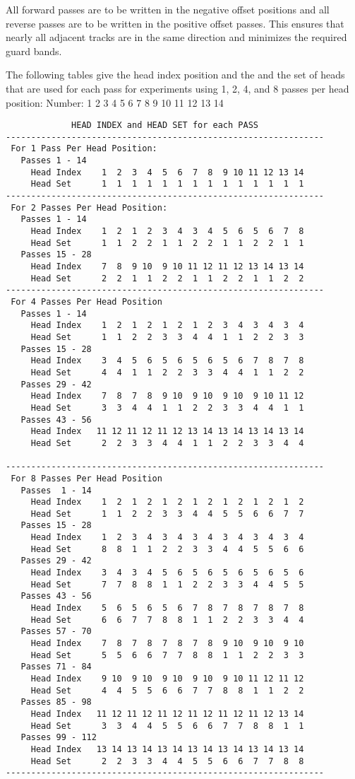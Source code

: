 \documentclass{report}
\begin{document}
All forward passes are to be written in the negative offset positions
and all reverse passes are to be written in the positive offset
passes.  This ensures that nearly all adjacent tracks are in the same
direction and minimizes the required guard bands.

The following tables give the head index position and the and the set
of heads that are used for each pass for experiments using 1, 2, 4,
and 8 passes per head position:
 Number:           1  2  3  4  5  6  7  8  9 10 11 12 13 14

\begin{verbatim}
             HEAD INDEX and HEAD SET for each PASS
---------------------------------------------------------------
 For 1 Pass Per Head Position:
   Passes 1 - 14
     Head Index    1  2  3  4  5  6  7  8  9 10 11 12 13 14
     Head Set      1  1  1  1  1  1  1  1  1  1  1  1  1  1
---------------------------------------------------------------
 For 2 Passes Per Head Position:
   Passes 1 - 14
     Head Index    1  2  1  2  3  4  3  4  5  6  5  6  7  8
     Head Set      1  1  2  2  1  1  2  2  1  1  2  2  1  1
   Passes 15 - 28
     Head Index    7  8  9 10  9 10 11 12 11 12 13 14 13 14
     Head Set      2  2  1  1  2  2  1  1  2  2  1  1  2  2
---------------------------------------------------------------
 For 4 Passes Per Head Position
   Passes 1 - 14
     Head Index    1  2  1  2  1  2  1  2  3  4  3  4  3  4
     Head Set      1  1  2  2  3  3  4  4  1  1  2  2  3  3
   Passes 15 - 28
     Head Index    3  4  5  6  5  6  5  6  5  6  7  8  7  8
     Head Set      4  4  1  1  2  2  3  3  4  4  1  1  2  2
   Passes 29 - 42
     Head Index    7  8  7  8  9 10  9 10  9 10  9 10 11 12
     Head Set      3  3  4  4  1  1  2  2  3  3  4  4  1  1
   Passes 43 - 56
     Head Index   11 12 11 12 11 12 13 14 13 14 13 14 13 14
     Head Set      2  2  3  3  4  4  1  1  2  2  3  3  4  4

---------------------------------------------------------------
 For 8 Passes Per Head Position
   Passes  1 - 14
     Head Index    1  2  1  2  1  2  1  2  1  2  1  2  1  2
     Head Set      1  1  2  2  3  3  4  4  5  5  6  6  7  7
   Passes 15 - 28
     Head Index    1  2  3  4  3  4  3  4  3  4  3  4  3  4
     Head Set      8  8  1  1  2  2  3  3  4  4  5  5  6  6
   Passes 29 - 42
     Head Index    3  4  3  4  5  6  5  6  5  6  5  6  5  6
     Head Set      7  7  8  8  1  1  2  2  3  3  4  4  5  5
   Passes 43 - 56
     Head Index    5  6  5  6  5  6  7  8  7  8  7  8  7  8
     Head Set      6  6  7  7  8  8  1  1  2  2  3  3  4  4
   Passes 57 - 70
     Head Index    7  8  7  8  7  8  7  8  9 10  9 10  9 10
     Head Set      5  5  6  6  7  7  8  8  1  1  2  2  3  3
   Passes 71 - 84
     Head Index    9 10  9 10  9 10  9 10  9 10 11 12 11 12
     Head Set      4  4  5  5  6  6  7  7  8  8  1  1  2  2
   Passes 85 - 98
     Head Index   11 12 11 12 11 12 11 12 11 12 11 12 13 14
     Head Set      3  3  4  4  5  5  6  6  7  7  8  8  1  1
   Passes 99 - 112
     Head Index   13 14 13 14 13 14 13 14 13 14 13 14 13 14
     Head Set      2  2  3  3  4  4  5  5  6  6  7  7  8  8
---------------------------------------------------------------
\end{verbatim}
\end{document}
